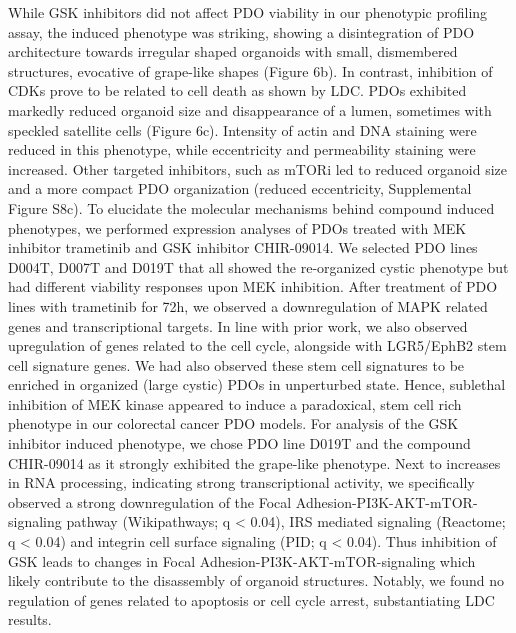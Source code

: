 While GSK inhibitors did not affect PDO viability in our phenotypic profiling assay, the induced phenotype was striking, showing a disintegration of PDO architecture towards irregular shaped organoids with small, dismembered structures, evocative of grape-like shapes (Figure 6b). In contrast, inhibition of CDKs prove to be related to cell death as shown by LDC. PDOs exhibited markedly reduced organoid size and disappearance of a lumen, sometimes with speckled satellite cells (Figure 6c). Intensity of actin and DNA staining were reduced in this phenotype, while eccentricity and permeability staining were increased. Other targeted inhibitors, such as mTORi led to reduced organoid size and a more compact PDO organization (reduced eccentricity, Supplemental Figure S8c). 	
To elucidate the molecular mechanisms behind compound induced phenotypes, we performed expression analyses of PDOs treated with MEK inhibitor trametinib and GSK inhibitor CHIR-09014. We selected PDO lines D004T, D007T and D019T that all showed the re-organized cystic phenotype but had different viability responses upon MEK inhibition. After treatment of PDO lines with trametinib for 72h, we observed a downregulation of MAPK related genes and transcriptional targets. In line with prior work, we also observed upregulation of genes related to the cell cycle, alongside with LGR5/EphB2 stem cell signature genes. We had also observed these stem cell signatures to be enriched in organized (large cystic) PDOs in unperturbed state. Hence, sublethal inhibition of MEK kinase appeared to induce a paradoxical, stem cell rich phenotype in our colorectal cancer PDO models. For analysis of the GSK inhibitor induced phenotype, we chose PDO line D019T and the compound CHIR-09014 as it strongly exhibited the grape-like phenotype. Next to increases in RNA processing, indicating strong transcriptional activity, we specifically observed a strong downregulation of the Focal Adhesion-PI3K-AKT-mTOR-signaling pathway (Wikipathways; q < 0.04), IRS mediated signaling (Reactome; q < 0.04) and integrin cell surface signaling (PID; q < 0.04). Thus inhibition of GSK leads to changes in Focal Adhesion-PI3K-AKT-mTOR-signaling which likely contribute to the disassembly of organoid structures. Notably, we found no regulation of genes related to apoptosis or cell cycle arrest, substantiating LDC results.

